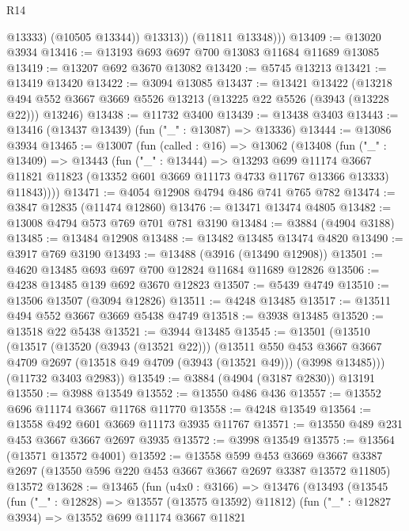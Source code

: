 \begin{lexlean}{R14}
\begin{coremodule}
                @13333)
              (@10505 @13344))
            @13313))
        (@11811 @13348)))
@13409 := @13020 @3934
@13416 := @13193 @693 @697 @700 @13083 @11684 @11689 @13085
@13419 := @13207 @692 @3670 @13082
@13420 := @5745 @13213
@13421 := @13419 @13420
@13422 := @3094 @13085
@13437 := @13421
    @13422
    (@13218 @494 @552 @3667 @3669 @5526 @13213 (@13225 @22 @5526 (@3943 (@13228 @22))) @13246)
@13438 := @11732 @3400
@13439 := @13438 @3403
@13443 := @13416 (@13437 @13439) (fun ("_" : @13087) => @13336)
@13444 := @13086 @3934
@13465 := @13007
    (fun (called : @16) =>
    @13062
      (@13408
        (fun ("_" : @13409) =>
        @13443
          (fun ("_" : @13444) =>
          @13293
            @699
            @11174
            @3667
            @11821
            @11823
            (@13352 @601 @3669 @11173 @4733 @11767 @13366 @13333)
            @11843))))
@13471 := @4054 @12908 @4794 @486 @741 @765 @782
@13474 := @3847 @12835 (@11474 @12860)
@13476 := @13471 @13474 @4805
@13482 := @13008 @4794 @573 @769 @701 @781 @3190
@13484 := @3884 (@4904 @3188)
@13485 := @13484 @12908
@13488 := @13482 @13485 @13474 @4820
@13490 := @3917 @769 @3190
@13493 := @13488 (@3916 (@13490 @12908))
@13501 := @4620 @13485 @693 @697 @700 @12824 @11684 @11689 @12826
@13506 := @4238 @13485 @139 @692 @3670 @12823
@13507 := @5439 @4749
@13510 := @13506 @13507 (@3094 @12826)
@13511 := @4248 @13485
@13517 := @13511 @494 @552 @3667 @3669 @5438 @4749
@13518 := @3938 @13485
@13520 := @13518 @22 @5438
@13521 := @3944 @13485
@13545 := @13501
    (@13510
      (@13517
        (@13520 (@3943 (@13521 @22)))
        (@13511
          @550
          @453
          @3667
          @3667
          @4709
          @2697
          (@13518 @49 @4709 (@3943 (@13521 @49)))
          (@3998 @13485)))
      (@11732 @3403 @2983))
@13549 := @3884 (@4904 (@3187 @2830)) @13191
@13550 := @3988 @13549
@13552 := @13550 @486 @436
@13557 := @13552 @696 @11174 @3667 @11768 @11770
@13558 := @4248 @13549
@13564 := @13558 @492 @601 @3669 @11173 @3935 @11767
@13571 := @13550 @489 @231 @453 @3667 @3667 @2697 @3935
@13572 := @3998 @13549
@13575 := @13564 (@13571 @13572 @4001)
@13592 := @13558
    @599
    @453
    @3669
    @3667
    @3387
    @2697
    (@13550 @596 @220 @453 @3667 @3667 @2697 @3387 @13572 @11805)
    @13572
@13628 := @13465
    (fun (u4x0 : @3166) =>
    @13476
      (@13493
        (@13545
          (fun ("_" : @12828) => @13557 (@13575 @13592) @11812)
          (fun ("_" : @12827 @3934) =>
          @13552
            @699
            @11174
            @3667
            @11821

\end{coremodule}
\end{lexlean}
